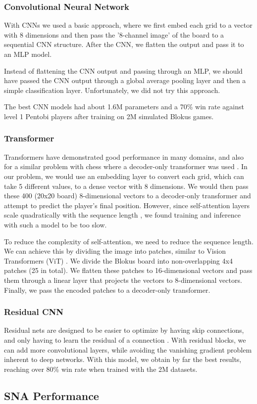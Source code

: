 \documentclass{article}
\begin{document}
\subsubsection{Convolutional Neural Network}
With CNNs we used a basic approach, where we first embed
each grid to a vector with 8 dimensions and then pass the
'8-channel image' of the board to a sequential CNN structure.
After the CNN, we flatten the output and pass it to an MLP model.

Instead of flattening the CNN output and passing through
an MLP, we should have passed the CNN output through a
global average pooling layer and then a simple
classification layer. Unfortunately, we did not try
this approach.

The best CNN models had about 1.6M parameters and a
70\% win rate against level 1 Pentobi players after
training on 2M simulated Blokus games.




\subsubsection{Transformer}
Transformers have demonstrated good performance in many
domains, and also for a similar problem with chess where
a decoder-only transformer was used \cite{ruoss2024grandmaster}.
In our problem, we would use an embedding layer to convert
each grid, which can take 5 different values, to a dense
vector with 8 dimensions. We would then pass these 400
(20x20 board) 8-dimensional vectors to a decoder-only
transformer and attempt to predict the player's final
position. However, since self-attention layers scale
quadratically with the sequence length \cite{vaswani2017attention},
we found training and inference with such a model to be too slow.

To reduce the complexity of self-attention, we need to
reduce the sequence length. We can achieve this by
dividing the image into patches, similar to Vision
Transformers (ViT) \cite{dosovitskiy2020image}. We
divide the Blokus board into non-overlapping 4x4
patches (25 in total). We flatten these patches to 
16-dimensional vectors and pass them through a linear
layer that projects the vectors to 8-dimensional vectors.
Finally, we pass the encoded patches to a decoder-only
transformer.




\subsubsection{Residual CNN}
Residual nets are designed to be easier to optimize
by having skip connections, and only having to learn
the residual of a connection \cite{he2016deep}.
With residual blocks, we can add more convolutional
layers, while avoiding the vanishing gradient problem
inherent to deep networks. With this model, we obtain
by far the best results, reaching over 80\% win rate
when trained with the 2M datasets.





\subsection{SNA Performance}



\printbibliography
\end{document}
